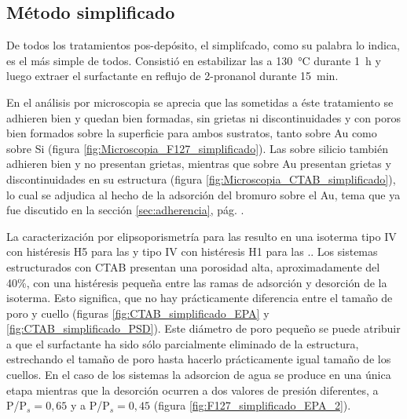 	 \subsection{Método simplificado}

		 	De todos los tratamientos pos-depósito, el simplifcado, como su palabra lo indica, es el más simple de todos. Consistió en estabilizar las \pdm\space a \SI{130}{\celsius} durante \SI{1}{\hour} y luego extraer el surfactante en reflujo de 2-pronanol durante \SI{15}{\minute}. 
			
			En el análisis por microscopia se aprecia que las \pdmF\space sometidas a éste tratamiento se adhieren bien y quedan bien formadas, sin grietas ni discontinuidades y con poros bien formados sobre la superficie para ambos sustratos, tanto sobre Au como sobre Si (figura \ref{fig:Microscopia_F127_simplificado}). Las \pdmC\space sobre silicio también adhieren bien y no presentan grietas, mientras que sobre Au presentan grietas y discontinuidades en su estructura (figura \ref{fig:Microscopia_CTAB_simplificado}), lo cual se adjudica al hecho de la adsorción del bromuro sobre el Au, tema que ya fue discutido en la sección \ref{sec:adherencia}, pág. \pageref{sec:adherencia}. 
			
			La caracterización por elipsoporismetría para las \pdmF\space resulto en una isoterma tipo IV con histéresis H5 para las \pdmC\space y tipo IV con histéresis H1 para las \pdmF.\cite{Thommes2015}. Los sistemas estructurados con CTAB presentan una porosidad alta, aproximadamente del 40\%, con una histéresis pequeña entre las ramas de adsorción y desorción de la isoterma. Esto significa, que no hay prácticamente diferencia entre el tamaño de poro y cuello (figuras \ref{fig:CTAB_simplificado_EPA}  y \ref{fig:CTAB_simplificado_PSD}). Este diámetro de poro pequeño se puede atribuir a que el surfactante ha sido sólo parcialmente eliminado de la estructura, estrechando el tamaño de poro hasta hacerlo prácticamente igual tamaño de los cuellos.
			En el caso de los sistemas \pdmF\space la adsorcion de agua se produce en una única etapa mientras que la desorción ocurren a dos valores de presión diferentes, a P/P$_s=0,65$ y a P/P$_s=0,45$ (figura \ref{fig:F127_simplificado_EPA_2}). 


